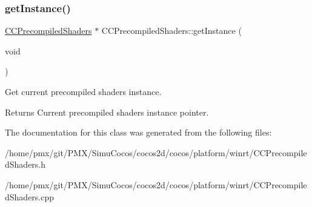 \subsubsection{\texorpdfstring{get\+Instance()}{getInstance()}}
{\footnotesize\ttfamily \hyperlink{classCCPrecompiledShaders}{C\+C\+Precompiled\+Shaders} $\ast$ C\+C\+Precompiled\+Shaders\+::get\+Instance (\begin{DoxyParamCaption}\item[{void}]{ }\end{DoxyParamCaption})\hspace{0.3cm}{\ttfamily [static]}}



Get current precompiled shaders instance. 

\begin{DoxyReturn}{Returns}
Current precompiled shaders instance pointer. 
\end{DoxyReturn}


The documentation for this class was generated from the following files\+:\begin{DoxyCompactItemize}
\item 
/home/pmx/git/\+P\+M\+X/\+Simu\+Cocos/cocos2d/cocos/platform/winrt/C\+C\+Precompiled\+Shaders.\+h\item 
/home/pmx/git/\+P\+M\+X/\+Simu\+Cocos/cocos2d/cocos/platform/winrt/C\+C\+Precompiled\+Shaders.\+cpp\end{DoxyCompactItemize}
